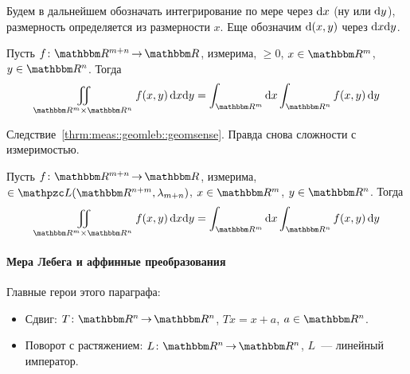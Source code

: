 \documentclass[draft, timbord]{longnotes}
\begin{document}
Будем в дальнейшем обозначать интегрирование по мере через $\mathrm{d} x$ (ну или
$\mathrm{d} y$), размерность определяется из размерности $x$. Еще обозначим $\mathrm{d} (x,y)$ через
$\mathrm{d} x\mathrm{d} y$. 

\begin{thrm}[Тонелли]\label{thrm:meas::mult::tonn}
  Пусть $f\colon \R^{m+n} \to \R$, измерима, $ \geqslant 0$, $x\in \R^m$, $y \in \R^n$.
  Тогда
  \[
    \iint_{\R^m \times \R^n} f(x,y) \, \del x\del y 
    = \int_{\R^m} \del x \int_{\R^n} f(x,y) \, \del y
  \]
\end{thrm}
\begin{tproof}
  Следствие~\ref{thrm:meas::geomleb::geomsense}. Правда снова сложности с измеримостью.
\end{tproof}

\begin{thrm}[Фубини]\label{thrm:meas::mult::fub}
  Пусть $f\colon \R^{m+n} \to \R$, измерима, $\in \summb(\R^{n+m}, \lambda_{m+n})$,
  $x\in \R^m$, $y \in \R^n$. Тогда
  \[
    \iint_{\R^m \times \R^n} f(x,y) \, \del x\del y 
    = \int_{\R^m} \del x \int_{\R^n} f(x,y) \, \del y
  \]
\end{thrm}

\paragraph{Мера Лебега и аффинные преобразования}
\label{par:meas::aff}

Главные герои этого параграфа:

\begin{itemize}[$\bigcirc$]
  \item Сдвиг: $T \colon \R^n \to \R^n$, $Tx = x+a$, $a\in \R^n$.
  \item Поворот с растяжением: $L \colon \R^n \to \R^n$, $L$~--- линейный император.
\end{itemize}
\end{document}
